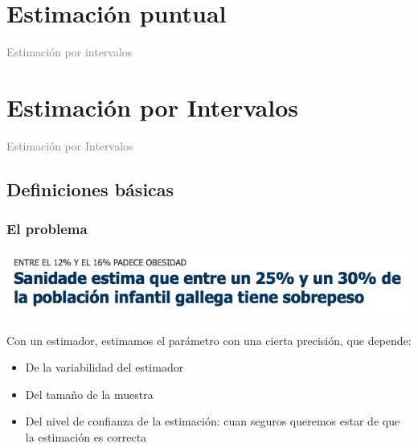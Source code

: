 \documentclass[12pt,t]{beamer}\usepackage[]{graphicx}\usepackage[]{color}
\title[\red{Matemáticas III GINF}]{}
\author[]{}
\date{}
\newcommand{\gray}[1]{\textcolor{gray}{#1}}
\renewcommand{\emph}[1]{{\color{red}#1}}
\theoremstyle{plain}
\theoremstyle{definition}
\begin{document}
\beamertemplatedotitem

\lstset{breaklines=true}
\lstset{basicstyle=\ttfamily}


\section{Estimación puntual}

\begin{frame}
\vfill
\begin{center}
\gray{\LARGE Estimación por intervalos}
\end{center}
\vfill
\end{frame}


\section{Estimación por Intervalos}

\begin{frame}
\vfill
\begin{center}
\gray{\LARGE Estimación por Intervalos}
\end{center}
\vfill
\end{frame}

\subsection{Definiciones básicas}

\begin{frame}
\frametitle{El problema}
\vspace*{-1cm}

\begin{center}
\hspace*{-0.6cm}
\includegraphics[width=1.1\linewidth]{sanidade}
\end{center}
\vspace*{-1ex}

Con un estimador, estimamos el parámetro con una cierta precisión, que depende:
\medskip

\begin{itemize}
\item De la variabilidad del estimador
\medskip

\item Del tamaño de la muestra
\medskip

\item Del \emph{nivel de confianza} de la  estimación: cuan seguros  queremos estar de que la estimación es correcta
\end{itemize}
\end{frame}
\end{document}
